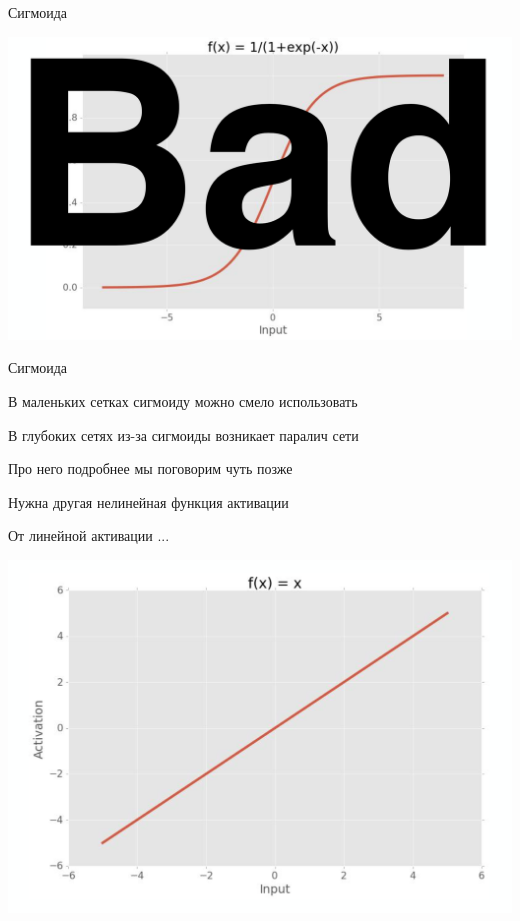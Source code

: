 \documentclass[notes,12pt, aspectratio=169]{beamer}
\newenvironment{wideitemize}{\itemize\addtolength{\itemsep}{10pt}}{\enditemize}
\begin{document}
\begin{frame}{Сигмоида}
\begin{center}
	\includegraphics[width=0.7\paperwidth]{activation_3.png}
\end{center}
\end{frame}


\begin{frame}{Сигмоида}
\begin{wideitemize}
	\item В маленьких сетках сигмоиду можно смело использовать
	\item В глубоких сетях из-за сигмоиды возникает \alert{паралич сети}
	\item Про него подробнее мы поговорим чуть позже
	\item Нужна другая нелинейная функция активации
\end{wideitemize}
\end{frame}


\begin{frame}{От линейной активации ... }
\begin{center}
	\includegraphics[width=0.7\paperwidth]{activation_1.png}
\end{center}
\end{frame}
\end{document}
